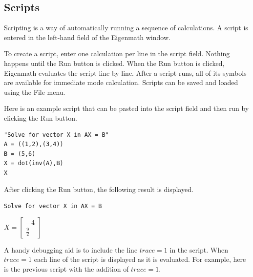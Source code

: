 
\subsection{Scripts}
Scripting is a way of automatically running a sequence of calculations.
A script is entered in the left-hand field of the Eigenmath window.

\begin{center}
\end{center}

To create a script, enter one calculation per line in the script field.
Nothing happens until the Run button is clicked. When the Run button is
clicked, Eigenmath evaluates the script line by line. After a script runs,
all of its symbols are available for immediate mode calculation.
Scripts can be saved and loaded using the File menu.

Here is an example script that can be pasted into the script field
and then run by clicking the Run button.

\begin{Verbatim}[formatcom=\color{blue}]
"Solve for vector X in AX = B"
A = ((1,2),(3,4))
B = (5,6)
X = dot(inv(A),B)
X
\end{Verbatim}

After clicking the Run button, the following result is displayed.

\verb$Solve for vector X in AX = B$

$\displaystyle X=\begin{bmatrix}-4\\ \frac{9}{2}\end{bmatrix}$

A handy debugging aid is to include the line $trace=1$ in the script.
When $trace=1$ each line of the script is displayed as it is evaluated.
For example, here is the previous script with the addition of
$trace=1$.

